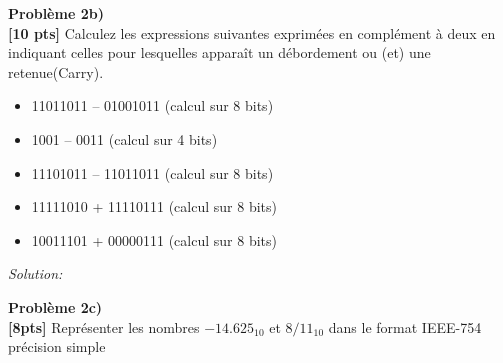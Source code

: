 \documentclass{article}
\newenvironment{problem}[2][Problème]
    { \begin{mdframed}[backgroundcolor=gray!20] \textbf{#1 #2} \\}
    {  \end{mdframed}}
\newenvironment{solution}
    {\textit{Solution:}}
    {}
\begin{document}
\newpage
\begin{problem}{2b)}
\textbf{[10 pts]} Calculez les expressions suivantes exprimées en complément à deux en indiquant
celles pour lesquelles apparaît un débordement ou (et) une retenue(Carry).
\begin{itemize}
        \item 11011011 – 01001011 (calcul sur 8 bits)
        \item 1001 – 0011 (calcul sur 4 bits)
        \item 11101011 – 11011011 (calcul sur 8 bits)
        \item 11111010 + 11110111 (calcul sur 8 bits)
        \item 10011101 + 00000111 (calcul sur 8 bits)
    \end{itemize}
\end{problem}
\begin{solution}
    








\end{solution}

\begin{problem}{2c)}
\textbf{[8pts]} Représenter les nombres $-14.625_{10}$ et $8/11_{10}$ dans le format IEEE-754 précision simple
\end{problem}
\end{document}
